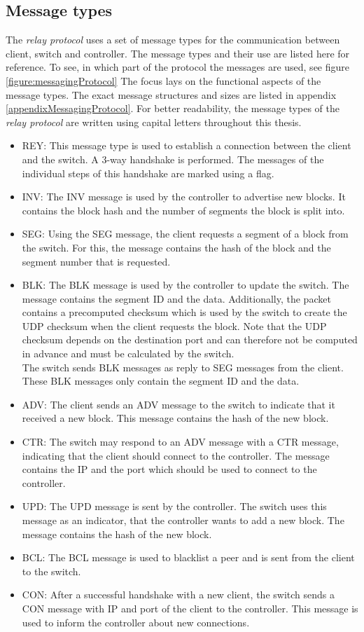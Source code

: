 \subsection{Message types \label{sec:messagingProtocol}}
The \textit{relay protocol} uses a set of message types for the communication between client, switch and controller. The message types and their use are listed here for reference. To see, in which part of the protocol the messages are used, see figure \ref{figure:messagingProtocol} The focus lays on the functional aspects of the message types. The exact message structures and sizes are listed in appendix \ref{appendixMessagingProtocol}. For better readability, the message types of the \textit{relay protocol} are written using capital letters throughout this thesis.
\begin{itemize}
	\item REY: This message type is used to establish a connection between the client and the switch. A 3-way handshake is performed. The messages of the individual steps of this handshake are marked using a flag.
	\item INV: The INV message is used by the controller to advertise new blocks. It contains the block hash and the number of segments the block is split into.
	\item SEG: Using the SEG message, the client requests a segment of a block from the switch. For this, the message contains the hash of the block and the segment number that is requested.
	\item BLK: The BLK message is used by the controller to update the switch. The message contains the segment ID and the data. Additionally, the packet contains a precomputed checksum which is used by the switch to create the UDP checksum when the client requests the block. Note that the UDP checksum depends on the destination port and can therefore not be computed in advance and must be calculated by the switch. \\ The switch sends BLK messages as reply to SEG messages from the client. These BLK messages only contain the segment ID and the data.
	\item ADV: The client sends an ADV message to the switch to indicate that it received a new block. This message contains the hash of the new block.
	\item CTR: The switch may respond to an ADV message with a CTR message, indicating that the client should connect to the controller. The message contains the IP and the port which should be used to connect to the controller.
	\item UPD: The UPD message is sent by the controller. The switch uses this message as an indicator, that the controller wants to add a new block. The message contains the hash of the new block.
	\item BCL: The BCL message is used to blacklist a peer and is sent from the client to the switch.
	\item CON: After a successful handshake with a new client, the switch sends a CON message with IP and port of the client to the controller. This message is used to inform the controller about new connections.
\end{itemize}




